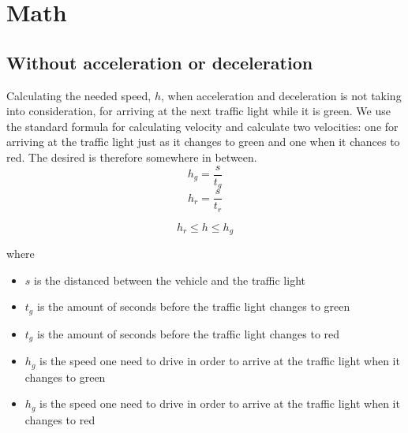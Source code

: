 \section{Math}

\subsection{Without acceleration or deceleration}
Calculating the needed speed, $h$, when acceleration and deceleration is not taking into consideration, for arriving at the next traffic light while it is green.
We use the standard formula for calculating velocity and calculate two velocities: one for arriving at the traffic light just as it changes to green and one when it chances to red. The desired is therefore somewhere in between.
\[h_g = \frac{s}{t_g}\]
\[h_r = \frac{s}{t_r}\]

\[h_r \leq h \leq h_g\]

where
\begin{itemize}
\item $s$ is the distanced between the vehicle and the traffic light
\item $t_g$ is the amount of seconds before the traffic light changes to green
\item $t_g$ is the amount of seconds before the traffic light changes to red
\item $h_g$ is the speed one need to drive in order to arrive at the traffic light when it changes to green
\item $h_g$ is the speed one need to drive in order to arrive at the traffic light when it changes to red
\end{itemize}
